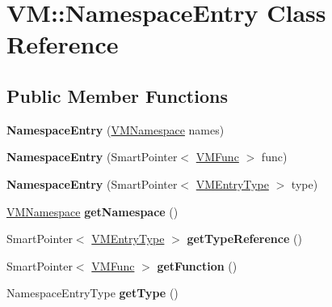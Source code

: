 \hypertarget{class_v_m_1_1_namespace_entry}{\section{V\-M\-:\-:Namespace\-Entry Class Reference}
\label{class_v_m_1_1_namespace_entry}
}
\subsection*{Public Member Functions}
\begin{DoxyCompactItemize}
\item 
\hypertarget{class_v_m_1_1_namespace_entry_ab338e4404b4dcb02f611ba2ea1337fbb}{{\bfseries Namespace\-Entry} (\hyperlink{class_hash_map}{V\-M\-Namespace} names)}\label{class_v_m_1_1_namespace_entry_ab338e4404b4dcb02f611ba2ea1337fbb}

\item 
\hypertarget{class_v_m_1_1_namespace_entry_a1e1c835181f5d45f720065ec37d0bdb4}{{\bfseries Namespace\-Entry} (Smart\-Pointer$<$ \hyperlink{class_v_m_1_1_v_m_func}{V\-M\-Func} $>$ func)}\label{class_v_m_1_1_namespace_entry_a1e1c835181f5d45f720065ec37d0bdb4}

\item 
\hypertarget{class_v_m_1_1_namespace_entry_a111823c65b9c0be5ff238c9db6211458}{{\bfseries Namespace\-Entry} (Smart\-Pointer$<$ \hyperlink{class_v_m_1_1_v_m_entry_type}{V\-M\-Entry\-Type} $>$ type)}\label{class_v_m_1_1_namespace_entry_a111823c65b9c0be5ff238c9db6211458}

\item 
\hypertarget{class_v_m_1_1_namespace_entry_af390906637086e7156dc849b0aaa10fe}{\hyperlink{class_hash_map}{V\-M\-Namespace} {\bfseries get\-Namespace} ()}\label{class_v_m_1_1_namespace_entry_af390906637086e7156dc849b0aaa10fe}

\item 
\hypertarget{class_v_m_1_1_namespace_entry_a64c19caa303f4c34786e32b18b0d3449}{Smart\-Pointer$<$ \hyperlink{class_v_m_1_1_v_m_entry_type}{V\-M\-Entry\-Type} $>$ {\bfseries get\-Type\-Reference} ()}\label{class_v_m_1_1_namespace_entry_a64c19caa303f4c34786e32b18b0d3449}

\item 
\hypertarget{class_v_m_1_1_namespace_entry_a311e05b9c1133f005a7078c0fafab51b}{Smart\-Pointer$<$ \hyperlink{class_v_m_1_1_v_m_func}{V\-M\-Func} $>$ {\bfseries get\-Function} ()}\label{class_v_m_1_1_namespace_entry_a311e05b9c1133f005a7078c0fafab51b}

\item 
\hypertarget{class_v_m_1_1_namespace_entry_a64e7528f2d8403acc86ec3a249a07cf4}{Namespace\-Entry\-Type {\bfseries get\-Type} ()}\label{class_v_m_1_1_namespace_entry_a64e7528f2d8403acc86ec3a249a07cf4}

\end{DoxyCompactItemize}
